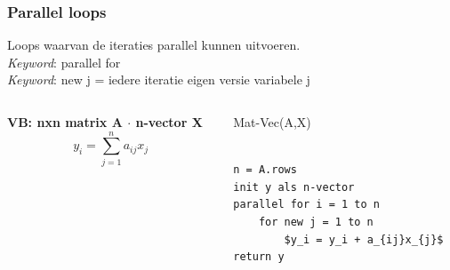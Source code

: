 \documentclass
   [kulak] %
   {kulakbeamer}
\begin{document}
\begin{frame}[fragile]
\frametitle{Parallel loops}

Loops waarvan de iteraties parallel kunnen uitvoeren. \\ \textit{Keyword}: parallel for\\
\textit{Keyword}: new j = iedere iteratie eigen versie variabele j

\pause

\begin{columns}[T] %
	
	
	
	\begin{column}{.3\textwidth}
		\begin{minipage}[c][.6\textheight][c]{\linewidth}
				
			\textbf{VB: nxn matrix A $\cdot$ n-vector X}
			\\
			\[
			y_i = \sum_{j=1}^n a_{ij}x_{j}
			\]
			
		\end{minipage}
	\end{column}
	
	
	
	\begin{column}{.65\textwidth}
		
		Mat-Vec(A,X)
		\begin{lstlisting}[style=CStyle]
		
n = A.rows
init y als n-vector
parallel for i = 1 to n
	for new j = 1 to n
		$y_i = y_i + a_{ij}x_{j}$
return y
		\end{lstlisting}
		
	\end{column}
	
	
	
	
	
\end{columns}

\end{frame}
\end{document}
